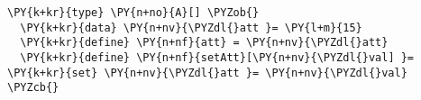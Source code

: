 \begin{Verbatim}[commandchars=\\\{\}]
\PY{k+kr}{type} \PY{n+no}{A}[] \PYZob{}
  \PY{k+kr}{data} \PY{n+nv}{\PYZdl{}att }= \PY{l+m}{15}
  \PY{k+kr}{define} \PY{n+nf}{att} = \PY{n+nv}{\PYZdl{}att}
  \PY{k+kr}{define} \PY{n+nf}{setAtt}[\PY{n+nv}{\PYZdl{}val] }= \PY{k+kr}{set} \PY{n+nv}{\PYZdl{}att }= \PY{n+nv}{\PYZdl{}val}
\PYZcb{}
\end{Verbatim}
